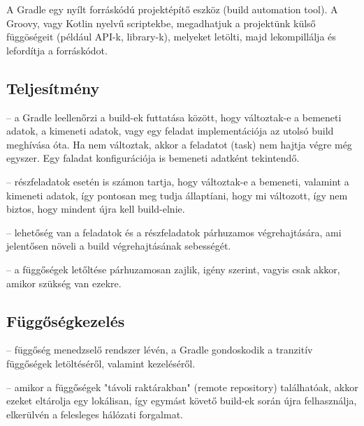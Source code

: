 A Gradle egy nyílt forráskódú projektépítő eszköz (build automation tool). A Groovy, vagy Kotlin nyelvű scriptekbe, megadhatjuk a projektünk külső függöségeit (például API-k, library-k), melyeket letölti, majd lekompillálja és lefordítja a forráskódot.

\subsection{Teljesítmény}

\begin{description}
	\setlength{\itemsep}{0.04mm}
	\item[Inkrementális build] -- a Gradle leellenőrzi a build-ek futtatása között, hogy változtak-e a bemeneti adatok, a kimeneti adatok, vagy egy feladat implementációja az utolsó build meghívása óta. Ha nem változtak, akkor a feladatot (task) nem hajtja végre még egyszer. Egy faladat konfigurációja is bemeneti adatként tekintendő.
	\item[Inktrementális részfeladatok] -- részfeladatok esetén is számon tartja, hogy változtak-e a bemeneti, valamint a kimeneti adatok, így pontosan meg tudja állaptíani, hogy mi változott, így nem biztos, hogy mindent újra kell build-elnie.
	\item[Párhuzamos végrehajtás] -- lehetőség van a feladatok és a részfeladatok párhuzamos végrehajtására, ami jelentősen növeli a build végrehajtásának sebességét.
	\item[Függőségek párhuzamos letöltése] -- a függőségek letőltése párhuzamosan zajlik, igény szerint, vagyis csak akkor, amikor szükség van ezekre.
\end{description}

\subsection{Függőségkezelés}

\begin{description}
	\setlength{\itemsep}{0.04mm}
	\item[Tranzitív függőségek] -- függőség menedzselő rendszer lévén, a Gradle gondoskodik a tranzitív függőségek letöltéséről, valamint kezeléséről.
	\item[Külső függőségek] -- amikor a függőségek "távoli raktárakban" (remote repository) találhatóak, akkor ezeket eltárolja egy lokálisan, így egymást követő build-ek során újra felhasználja, elkerülvén a felesleges hálózati forgalmat.
\end{description}

